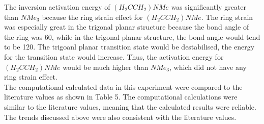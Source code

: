 \documentclass[twocolumn]{article} %
\begin{document}
The inversion activation energy of $(H_2CCH_2)NMe$ was significantly greater than $NMe_3$ because the ring strain effect for $(H_2CCH_2)NMe$. The ring strain was especially great in the trigonal planar structure because the bond angle of the ring was 60\textdegree, while in the trigonal planar structure, the bond angle would tend to be 120\textdegree. The trigoanl planar transition state would be destabilised, the energy for the transition state would increase. Thus, the activation energy for $(H_2CCH_2)NMe$ would be much higher than $NMe_3$, which did not have any ring strain effect. \\[1\baselineskip]

The computational calculated data in this experiment were compared to the literature values as shown in Table 5. The computational calculations were similar to the literature values, meaning that the calculated results were reliable. The trends discussed above were also consistent with the literature values. \\[3\baselineskip]
\end{document}
